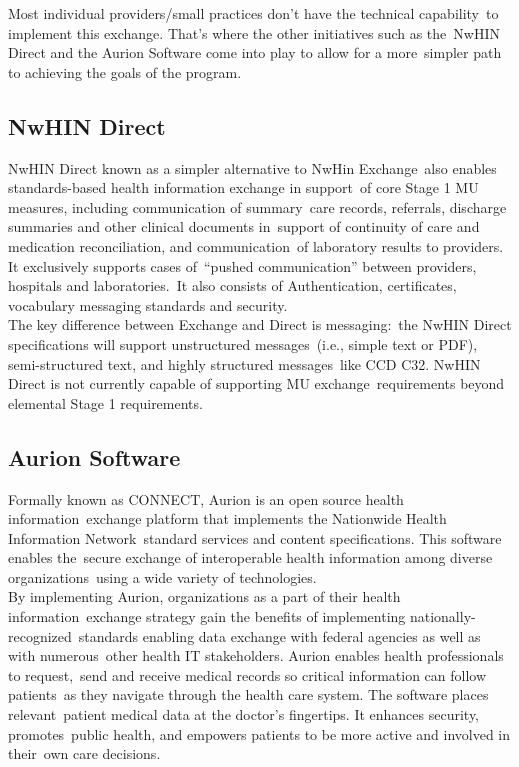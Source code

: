   	Most individual providers/small practices don't have the technical capability\
 to implement this exchange. That's where the other initiatives such as the\
NwHIN Direct and the Aurion Software come into play to allow for a more\
 simpler path to achieving the goals of the program.\\

 \subsection{NwHIN Direct}

 	NwHIN Direct known as a simpler alternative to NwHin Exchange\
also enables standards-based health information exchange in support\
 of core Stage 1 MU measures, including communication of summary\
care records, referrals, discharge summaries and other clinical documents in\
 support of continuity of care and medication reconciliation, and communication\
 of laboratory results to providers. It exclusively supports cases of\
 “pushed communication” between providers, hospitals and laboratories.\
 It also consists of Authentication, certificates, vocabulary messaging standards and security.\\

The key difference between Exchange and Direct is messaging:\
 the NwHIN Direct specifications will support unstructured messages\
(i.e., simple text or PDF), semi-structured text, and highly structured messages\
 like CCD C32. NwHIN Direct is not currently capable of supporting MU exchange\
requirements beyond elemental Stage 1 requirements.\
\citep{_nwhin_exchange_2013}\

  \subsection{Aurion Software}

	Formally known as CONNECT, Aurion is an open source health information\
exchange platform that implements the Nationwide Health Information Network\
 standard services and content specifications. This software enables the\
secure exchange of interoperable health information among diverse organizations\
 using a wide variety of technologies.\\

By implementing Aurion, organizations as a part of their health information\
 exchange strategy gain the benefits of implementing nationally-recognized\
 standards enabling data exchange with federal agencies as well as with numerous\
 other health IT stakeholders. Aurion enables health professionals to request,\
 send and receive medical records so critical information can follow patients\
as they navigate through the health care system. The software places relevant\
 patient medical data at the doctor’s fingertips. It enhances security, promotes\
 public health, and empowers patients to be more active and involved in their\
 own care decisions.\citep{_aurion_software_2013}
